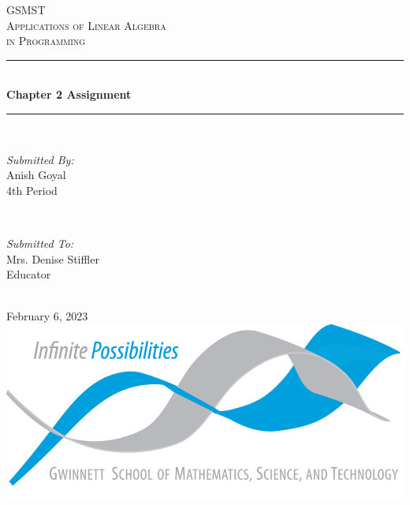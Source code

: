 \begin{titlepage}

    \newcommand{\HRule}{\rule{\linewidth}{0.5mm}}
    
    \center
    
    \textsc{\LARGE GSMST }\\[0.3cm]
    \textsc{\Large Applications of Linear Algebra }\\[0.3cm]
    \textsc{\Large in Programming}\\[0.5cm]
    
    \HRule \\[0.4cm]
    { \huge \bfseries Chapter 2 Assignment}\\[0.03cm]
    \HRule \\[1.5cm]
    
    \begin{minipage}{0.4\textwidth}
    \begin{flushleft} \large
    \emph{Submitted By:}\\
    Anish Goyal \\4th Period
    \end{flushleft}
    \end{minipage}
    ~
    \begin{minipage}{0.4\textwidth}
    \begin{flushright} \large
    \emph{Submitted To:} \\
    Mrs. Denise Stiffler\\Educator
    \end{flushright}
    \end{minipage}\\[1cm]
    
    {\large February 6, 2023}\\[1cm]
    
    \includegraphics{logo.png}\\[1cm]
    \vfill
    \end{titlepage}